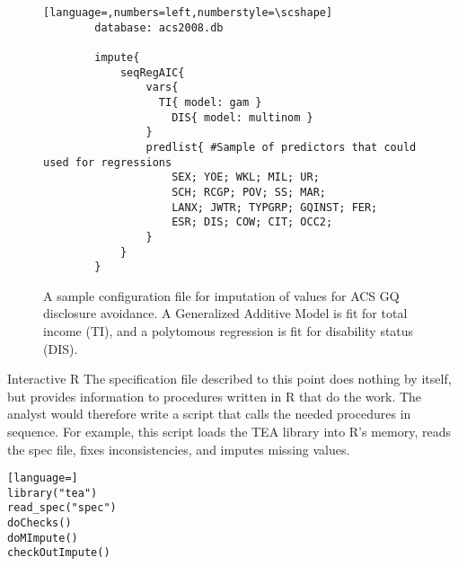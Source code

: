 \documentclass{article}
\begin{document}
        \begin{figure}
        \begin{lstlisting}[language=,numbers=left,numberstyle=\scshape]
        database: acs2008.db

        impute{
            seqRegAIC{
                vars{
                  TI{ model: gam }
                    DIS{ model: multinom }
                }
                predlist{ #Sample of predictors that could used for regressions
                    SEX; YOE; WKL; MIL; UR;
                    SCH; RCGP; POV; SS; MAR;
                    LANX; JWTR; TYPGRP; GQINST; FER;
                    ESR; DIS; COW; CIT; OCC2;
                }
            }
        }

        \end{lstlisting}
        \caption{A sample configuration file for imputation of values for ACS GQ
        disclosure avoidance. A Generalized Additive Model is fit for total income (TI),
        and a polytomous regression is fit for disability status (DIS). }
        \label{acsconfig}
        \end{figure}
\else \fi


{Interactive R}
The specification file described to this point does nothing by itself, but provides
information to procedures written in R that do the work. The analyst would therefore write
a script that calls the needed procedures in sequence. For example, this script loads the
TEA library into R's memory, reads the spec file, fixes inconsistencies, and imputes
missing values.

\begin{lstlisting}[language=]
library("tea")
read_spec("spec")
doChecks()
doMImpute()
checkOutImpute()
\end{lstlisting}

%
%
%
\end{document}

